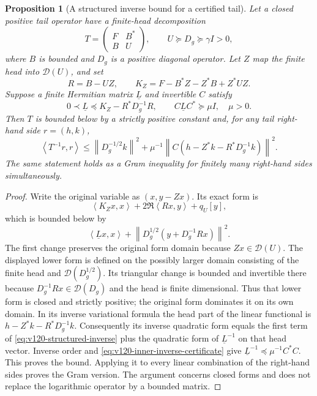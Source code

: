 \documentclass[11pt]{article}
\newtheorem{proposition}[theorem]{Proposition}
\theoremstyle{remark}
\newcommand{\norm}[1]{\left\lVert #1\right\rVert}
\newcommand{\ip}[2]{\left\langle #1,#2\right\rangle}
\begin{document}
\begin{proposition}[A structured inverse bound for a certified tail]
\label{prop:v120-structured-inverse}
Let a closed positive tail operator have a finite-head decomposition
\[
 T=\begin{pmatrix}F&B^*\\ B&U\end{pmatrix},
 \qquad U\succeq D_g\succeq\gamma I>0,
\]
where $B$ is bounded and $D_g$ is a positive diagonal operator.
Let $Z$ map the finite head into $\mathcal D(U)$, and set
\[
 R=B-UZ,\qquad K_Z=F-B^*Z-Z^*B+Z^*UZ.
\]
Suppose a finite Hermitian matrix $\underline L$ and invertible $C$
satisfy
\begin{equation}\label{eq:v120-inner-inverse-certificate}
 0\prec\underline L\preceq K_Z-R^*D_g^{-1}R,
 \qquad C\underline L C^*\succeq\mu I,\quad\mu>0.
\end{equation}
Then $T$ is bounded below by a strictly positive constant and, for
any tail right-hand side $r=(h,k)$,
\begin{equation}\label{eq:v120-structured-inverse}
 \ip{T^{-1}r}{r}
 \le \norm{D_g^{-1/2}k}^2+
 \mu^{-1}\norm{C(h-Z^*k-R^*D_g^{-1}k)}^2.
\end{equation}
The same statement holds as a Gram inequality for finitely many
right-hand sides simultaneously.
\end{proposition}
\begin{proof}
Write the original variable as $(x,y-Zx)$. Its exact form is
\[
 \ip{K_Zx}{x}+2\Re\ip{Rx}{y}+q_U[y],
\]
which is bounded below by
\[
 \ip{\underline Lx}{x}
       +\norm{D_g^{1/2}(y+D_g^{-1}Rx)}^2.
\]
The first change preserves the original form domain because
$Zx\in\mathcal D(U)$. The displayed lower form is defined on the
possibly larger domain consisting of the finite head and
$\mathcal D(D_g^{1/2})$. Its triangular change is bounded and
invertible there because $D_g^{-1}Rx\in\mathcal D(D_g)$ and the
head is finite dimensional. Thus that lower form is closed and
strictly positive; the original form dominates it on its own domain.
In its inverse variational formula the head part of the linear
functional is $h-Z^*k-R^*D_g^{-1}k$. Consequently its inverse
quadratic form equals the first term of
\eqref{eq:v120-structured-inverse} plus the quadratic form of
$\underline L^{-1}$ on that head vector. Inverse order and
\eqref{eq:v120-inner-inverse-certificate} give
$\underline L^{-1}\preceq\mu^{-1}C^*C$. This proves the bound.
Applying it to every linear combination of the right-hand sides
proves the Gram version. The argument concerns closed forms and
does not replace the logarithmic operator by a bounded matrix.
\end{proof}
\end{document}
